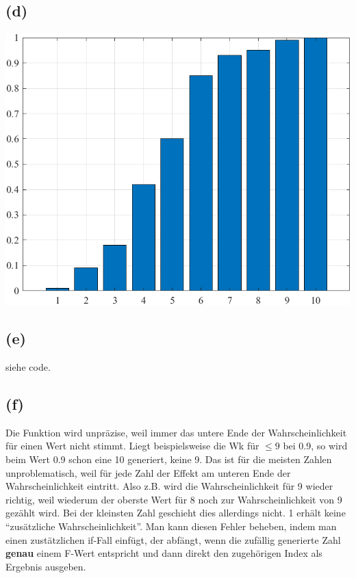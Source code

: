 \documentclass[a4paper]{scrartcl}
\begin{document}
\subsection*{(d)}

\begin{center}
	\includegraphics*[scale = 0.5]{question4d.png}
\end{center}
\subsection*{(e)}
siehe code.
\subsection*{(f)} %
Die Funktion wird unpräzise, weil immer das untere Ende der Wahrscheinlichkeit für einen Wert nicht stimmt. Liegt beispielsweise die Wk für $\leq 9$ bei 0.9, so wird beim Wert 0.9 schon eine 10 generiert, keine 9. Das ist für die meisten Zahlen unproblematisch, weil für jede Zahl der Effekt am unteren Ende der Wahrscheinlichkeit eintritt. Also z.B. wird die Wahrscheinlichkeit für 9 wieder richtig, weil wiederum der oberste Wert für 8 noch zur Wahrscheinlichkeit von 9 gezählt wird. Bei der kleinsten Zahl geschieht dies allerdings nicht. 1 erhält keine ``zusätzliche Wahrscheinlichkeit''. Man kann diesen Fehler beheben, indem man einen zustätzlichen if-Fall einfügt, der abfängt, wenn die zufällig generierte Zahl \textbf{genau} einem F-Wert entspricht und dann direkt den zugehörigen Index als Ergebnis ausgeben.
\end{document}
